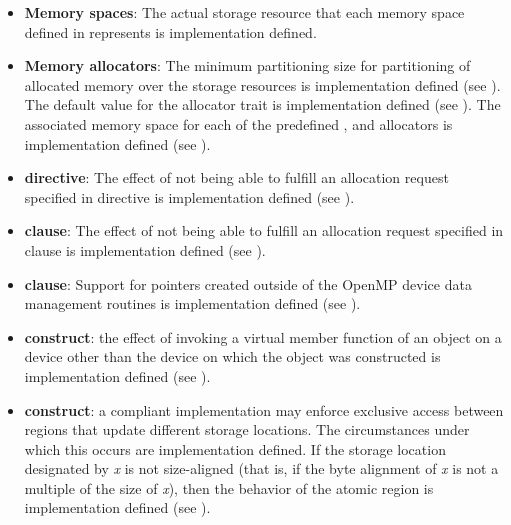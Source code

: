\begin{itemize}
\item \textbf{Memory spaces}: The actual storage resource that each memory 
      space defined in  represents is 
      implementation defined.
\item \textbf{Memory allocators}: The minimum partitioning size for partitioning 
      of allocated memory over the storage resources is implementation defined 
      (see ). The default value for the 
       allocator trait is implementation defined (see 
      ). The associated memory space for each of 
      the predefined ,  
      and  allocators is implementation defined 
      (see ).
\item {} \textbf{directive}: The effect of not being able to 
      fulfill an allocation request specified in  directive 
      is implementation defined (see ).
\item {} \textbf{clause}: The effect of not being able to fulfill 
      an allocation request specified in  clause is implementation 
      defined (see ).
\item {} \textbf{clause}: Support for pointers created outside 
      of the OpenMP device data management routines is implementation defined 
      (see ).
\item {} \textbf{construct}: the effect of invoking a virtual member
      function of an object on a device other than the device on which the object 
      was constructed is implementation defined (see 
      ).
\item {} \textbf{construct}: a compliant implementation may enforce 
      exclusive access 
      between  regions that update different storage locations. 
      The circumstances under which this occurs are implementation defined. 
      If the storage location designated by \emph{x} is not size-aligned (that 
      is, if the byte alignment of \emph{x} is not a multiple of the size of 
      \emph{x}), then the behavior of the atomic region is implementation 
      defined (see ).


\end{itemize}
